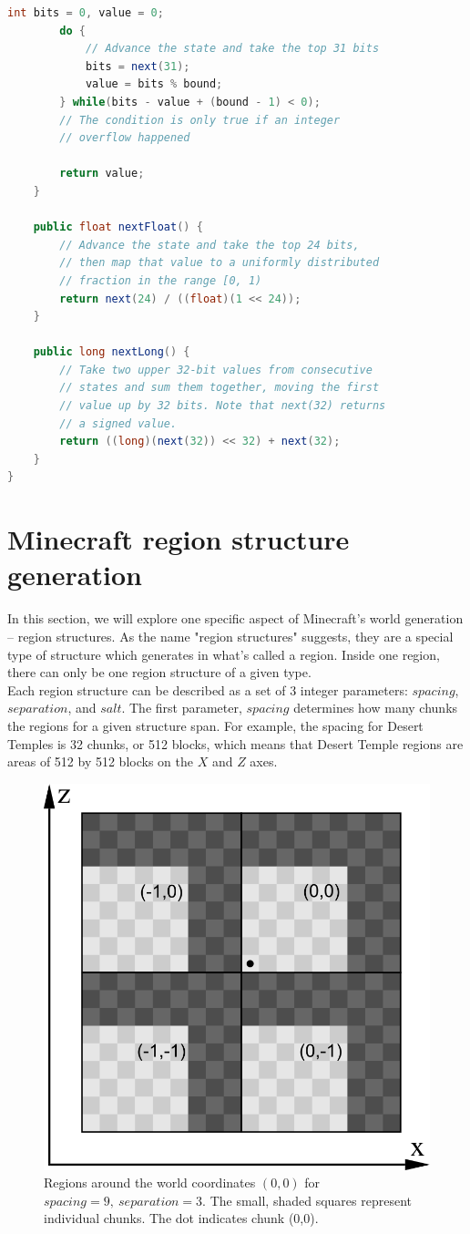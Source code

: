 \documentclass{article}
\begin{document}
\begin{lstlisting}[language=Java]
        int bits = 0, value = 0;
        do {
            // Advance the state and take the top 31 bits
            bits = next(31);
            value = bits % bound;
        } while(bits - value + (bound - 1) < 0);
        // The condition is only true if an integer 
        // overflow happened
        
        return value;
    }

    public float nextFloat() {
        // Advance the state and take the top 24 bits, 
        // then map that value to a uniformly distributed 
        // fraction in the range [0, 1)
        return next(24) / ((float)(1 << 24));
    }

    public long nextLong() {
        // Take two upper 32-bit values from consecutive 
        // states and sum them together, moving the first 
        // value up by 32 bits. Note that next(32) returns
        // a signed value.
        return ((long)(next(32)) << 32) + next(32);
    }
}
\end{lstlisting}

\section{Minecraft region structure generation}\label{appendix.regionstructures}

In this section, we will explore one specific aspect of Minecraft's world generation -- region structures.
As the name "region structures" suggests, they are a special type of structure which generates in what's called a region. Inside one region, there can only be one region structure of a given type.\\
Each region structure can be described as a set of 3 integer parameters: $spacing$, $separation$, and $salt$. The first parameter, $spacing$ determines how many chunks the regions for a given structure span. For example, the spacing for Desert Temples is 32 chunks, or 512 blocks, which means that Desert Temple regions are areas of 512 by 512 blocks on the $X$ and $Z$ axes. \\

\begin{figure}[htbp]
    \centering
    \includegraphics[width=0.5\linewidth]{regions.png}
    \caption{Regions around the world coordinates $(0,0)$ for $spacing = 9, \ separation = 3$. The small, shaded squares represent individual chunks. The dot indicates chunk (0,0).}
    \label{fig:regions}
\end{figure}
\end{document}
